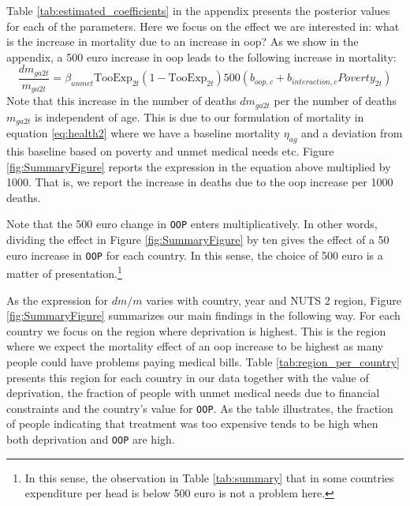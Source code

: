 \documentclass[a4paper,12pt]{article}
\begin{document}
Table \ref{tab:estimated_coefficients} in the appendix presents the posterior values for each of the parameters. Here we focus on the effect we are interested in: what is the increase in mortality due to an increase in oop? As we show in the appendix, a 500 euro increase in oop leads to the following increase in mortality:
\begin{equation}
\label{eq:change_mortality}
\frac{dm_{ga2t}}{m_{ga2t}} = \beta_{unmet} \text{TooExp}_{2t}(1-\text{TooExp}_{2t}) 500 (b_{oop,c}+b_{interaction,c} Poverty_{2t})
\end{equation}
Note that this increase in the number of deaths \(dm_{ga2t}\) per the number of deaths \(m_{ga2t}\) is independent of age. This is due to our formulation of mortality in equation \eqref{eq:health2} where we have a baseline mortality \(\eta_{ag}\) and a deviation from this baseline based on poverty and unmet medical needs etc. Figure \ref{fig:SummaryFigure} reports the expression in the equation above multiplied by 1000. That is, we report the increase in deaths due to the oop increase per 1000 deaths.

Note that the 500 euro change in \texttt{OOP} enters multiplicatively. In other words, dividing the effect in Figure \ref{fig:SummaryFigure} by ten gives the effect of a 50 euro increase in \texttt{OOP} for each country. In this sense, the choice of 500 euro is a matter of presentation.\footnote{In this sense, the observation in Table \ref{tab:summary} that in some countries expenditure per head is below 500 euro is not a problem here.}

As the expression for \(dm/m\) varies with country, year and NUTS 2 region, Figure \ref{fig:SummaryFigure} summarizes our main findings in the following way. For each country we focus on the region where deprivation is highest. This is the region where we expect the mortality effect of an oop increase to be highest as many people could have problems paying medical bills. Table \ref{tab:region_per_country} presents this region for each country in our data together with the value of deprivation, the fraction of people with unmet medical needs due to financial constraints and the country's value for \texttt{OOP}. As the table illustrates, the fraction of people indicating that treatment was too expensive tends to be high when both deprivation and \texttt{OOP} are high.
\end{document}
